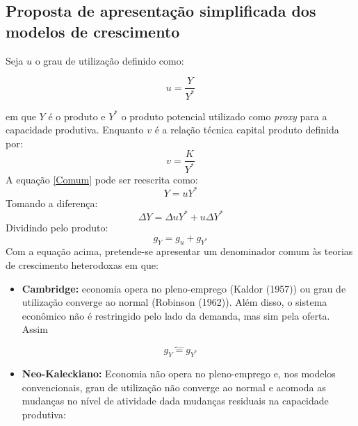 \documentclass[]{article}
\providecommand{\tightlist}{%
  \setlength{\itemsep}{0pt}\setlength{\parskip}{0pt}}
\begin{document}
\subsection{Proposta de apresentação simplificada dos modelos de
crescimento}\label{proposta-de-apresentacao-simplificada-dos-modelos-de-crescimento}

Seja \(u\) o grau de utilização definido como:

\begin{equation}
\label{Comum}
u = \frac{Y}{Y^*}
\end{equation}

em que \(Y\) é o produto e \(Y^*\) o produto potencial utilizado como
\emph{proxy} para a capacidade produtiva. Enquanto \(v\) é a relação
técnica capital produto definida por: \begin{equation}
v = \frac{K}{Y^*}
\end{equation} A equação \ref{Comum} pode ser reescrita como: \begin{equation}
Y = uY^* 
\end{equation} Tomando a diferença: \begin{equation}
\Delta Y = \Delta uY^* + u\Delta Y^*
\end{equation} Dividindo pelo produto: \begin{equation}
g_Y = g_u + g_{Y^*}
\end{equation} Com a equação acima, pretende-se apresentar um denominador comum às
teorias de crescimento heterodoxas em que:

\begin{itemize}
\tightlist
\item
  \textbf{Cambridge:} economia opera no pleno-emprego (Kaldor (1957)) ou
  grau de utilização converge ao normal (Robinson (1962)). Além disso, o
  sistema econômico não é restringido pelo lado da demanda, mas sim pela
  oferta. Assim
\end{itemize}

\begin{equation}
g_Y \stackrel{\leftharpoonup}{=} g_{Y^*}
\end{equation}

\begin{itemize}
\tightlist
\item
  \textbf{Neo-Kaleckiano:} Economia não opera no pleno-emprego e, nos
  modelos convencionais, grau de utilização não converge ao normal e
  acomoda as mudanças no nível de atividade dada mudanças residuais na
  capacidade produtiva:
\end{itemize}
\end{document}
